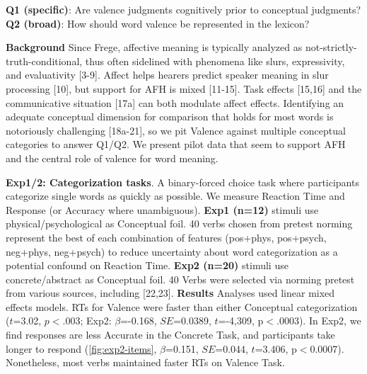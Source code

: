 \vspace{-.3cm}
\begin{tcolorbox}[colback=white]
\vspace{-.2cm}
\centering
\textbf{Q1 (specific)}: Are valence judgments cognitively prior to conceptual judgments? \\ 
\textbf{Q2 (broad)}: How should word valence be represented in the lexicon?
\vspace{-.2cm}
\end{tcolorbox}
\vspace{-.2cm}
\noindent \textbf{Background}
Since Frege, affective meaning is typically analyzed as not-strictly-truth-conditional, thus often sidelined with phenomena like slurs, expressivity, and evaluativity [3-9]. Affect helps hearers predict speaker meaning in slur processing [10], but support for AFH is mixed [11-15]. Task effects [15,16] and the communicative situation [17a] can both modulate affect effects. Identifying an adequate conceptual dimension for comparison that holds for most words is notoriously challenging [18a-21], so we pit Valence against multiple conceptual categories to answer Q1/Q2. We present pilot data that seem to support AFH and the central role of valence for word meaning.




\noindent \textbf{Exp1/2: Categorization tasks}. A binary-forced choice task where participants categorize single words as quickly as possible. We measure Reaction Time and Response (or Accuracy where unambiguous). \textbf{Exp1 (n=12)} stimuli use physical/psychological as Conceptual foil. 
40 verbs chosen from pretest norming represent the best of each combination of features (pos+phys, pos+psych, neg+phys, neg+psych) to reduce uncertainty about word categorization as a potential confound on Reaction Time. 
\textbf{Exp2 (n=20)} stimuli use concrete/abstract as Conceptual foil. 40 Verbs were selected via norming pretest from various sources, including [22,23].
\textbf{Results} Analyses used linear mixed effects models. RTs for Valence were faster than either Conceptual categorization ($t$=3.02, $p<$.003; Exp2: $\beta$=-0.168, $SE$=0.0389, $t$=-4,309, p$<$.0003). In Exp2, we find responses are less Accurate in the Concrete Task, and participants take longer to respond (\ref{fig:exp2-items}, $\beta$=0.151, $SE$=0.044, $t$=3.406, p$<$0.0007). Nonetheless, most verbs maintained faster RTs on Valence Task.

